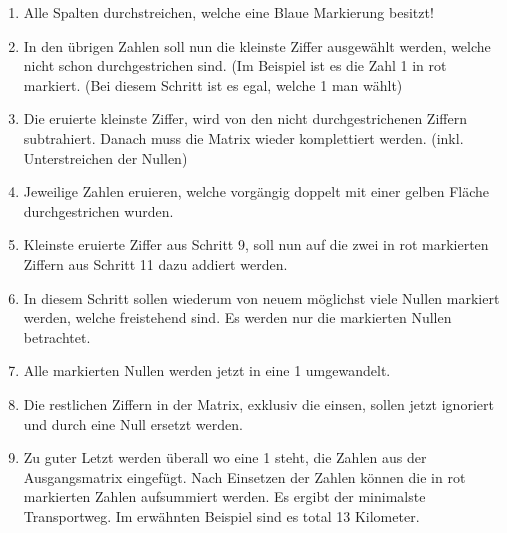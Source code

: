 \begin{enumerate}
\item Alle Spalten durchstreichen, welche eine Blaue Markierung besitzt!

\item In den übrigen Zahlen soll nun die kleinste Ziffer ausgewählt werden, welche nicht schon durchgestrichen sind.
(Im Beispiel ist es die Zahl 1 in rot markiert. (Bei diesem Schritt ist es egal, welche 1 man wählt)

\item Die eruierte kleinste Ziffer, wird von den nicht durchgestrichenen Ziffern
subtrahiert. Danach muss die Matrix wieder komplettiert werden. (inkl. Unterstreichen der Nullen)

\item Jeweilige Zahlen eruieren, welche vorgängig doppelt mit einer gelben Fläche durchgestrichen wurden.

\item Kleinste eruierte Ziffer aus Schritt 9, soll nun auf die zwei in rot markierten Ziffern aus Schritt 11 dazu addiert werden. 

\item In diesem Schritt sollen wiederum von neuem möglichst viele Nullen markiert werden,
welche freistehend sind. Es werden nur die markierten Nullen betrachtet.

\item Alle markierten Nullen werden jetzt in eine 1 umgewandelt.

\item Die restlichen Ziffern in der Matrix, exklusiv die einsen, sollen jetzt ignoriert und durch eine Null ersetzt werden.

\item Zu guter Letzt werden überall wo eine 1 steht, die Zahlen aus der Ausgangsmatrix eingefügt. Nach Einsetzen der Zahlen können die in rot markierten Zahlen aufsummiert werden. Es ergibt der minimalste Transportweg. Im erwähnten Beispiel sind es total 13 Kilometer.
\end{enumerate}


